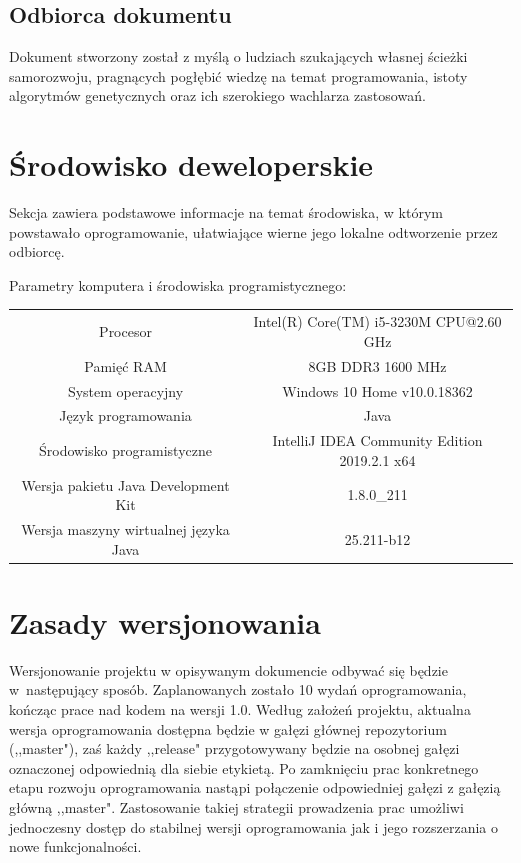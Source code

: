 \documentclass[10pt,oneside]{article}
\begin{document}
	\subsection{Odbiorca dokumentu}
	Dokument stworzony został z myślą o ludziach szukających własnej ścieżki samorozwoju, pragnących pogłębić wiedzę na temat programowania, istoty algorytmów genetycznych oraz ich szerokiego wachlarza zastosowań. 
	
	\section{Środowisko deweloperskie}
	Sekcja zawiera podstawowe informacje na temat środowiska, w którym powstawało oprogramowanie, ułatwiające wierne jego lokalne odtworzenie przez odbiorcę.
	\begin{center}
		Parametry komputera i środowiska programistycznego:
		\newline \newline
		\begin{tabular}{|c|c|} \hline
			Procesor & Intel(R) Core(TM) i5-3230M CPU@2.60 GHz
			\\[10pt] Pamięć RAM & 8GB DDR3 1600 MHz
			\\[10pt] System operacyjny & Windows 10 Home v10.0.18362
			\\[10pt] Język programowania & Java
			\\[10pt] Środowisko programistyczne & IntelliJ IDEA Community Edition 2019.2.1 x64
			\\[10pt] Wersja pakietu Java Development Kit & 1.8.0\_211
			\\[10pt] Wersja maszyny wirtualnej języka Java & 25.211-b12\\ \hline
		\end{tabular}
	\end{center}
	
	\section{Zasady wersjonowania}
	Wersjonowanie projektu w opisywanym dokumencie odbywać się będzie w~następujący sposób. Zaplanowanych zostało 10 wydań oprogramowania, kończąc prace nad kodem na wersji 1.0. Według założeń projektu, aktualna wersja oprogramowania dostępna będzie w gałęzi głównej repozytorium (,,master"), zaś każdy ,,release" przygotowywany będzie na osobnej gałęzi oznaczonej odpowiednią dla siebie etykietą. Po zamknięciu prac konkretnego etapu rozwoju oprogramowania nastąpi połączenie odpowiedniej gałęzi z gałęzią główną ,,master". Zastosowanie takiej strategii prowadzenia prac umożliwi jednoczesny dostęp do stabilnej wersji oprogramowania jak i jego rozszerzania o nowe funkcjonalności.
	
\end{document}
